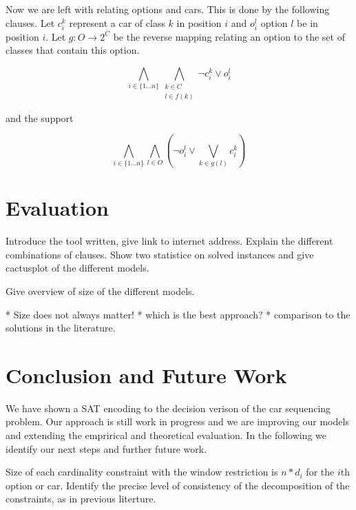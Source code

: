 \documentclass[]{llncs}
\newcommand{\todo}[1]{ {\color{red}{#1} }}
\begin{document}
Now we are left with relating options and cars. This is done by the following clauses. Let $c^k_i$ represent a car of
class $k$ in position $i$ and $o^l_i$ option $l$ be in position $i$. Let $g:O \rightarrow 2^C$ be the reverse mapping
relating an option to the set of classes that contain this option. 

\begin{equation}
    \bigwedge_{i\in \{1\ldots n\}} \bigwedge_{\substack{k \in C \\ l \in
    f(k)}} \neg c^k_{i} \vee o^l_{i}
\end{equation}

and the support

\begin{equation}
    \bigwedge_{i \in \{1\dots n\}} \bigwedge_{l\in O} \left(\neg o^l_{i} \vee
    \bigvee_{k \in g(l)} c^k_{i}\right)
\end{equation}


\section{Evaluation}

\todo{1 Describe evaluation}

Introduce the tool written, give link to internet address. Explain the different combinations of clauses. Show two
statistice on solved instances and give cactusplot of the different models. 

\todo{create table for size and solving time. experiment with cactus plots}

Give overview of size of the different models. 

* Size does not always matter!
* which is the best approach? 
* comparison to the solutions in the literature.

\section{Conclusion and  Future Work}

\todo{6}

We have shown a SAT encoding to the decision verison of the car sequencing problem. Our approach is still work in
progress and we are improving our models and extending the emprirical and theoretical evaluation. In the following we
identify our next steps and further future work. 

Size of each cardinality constraint with the window restriction is $n*d_i$ for the $i$th option or car. 
Identify the precise level of consistency of the decomposition of the constraints, as in previous literture. 
\end{document}
